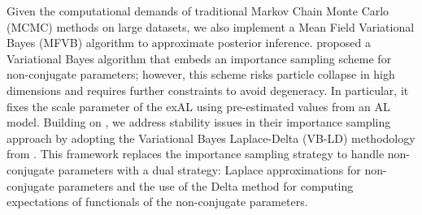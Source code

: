 \documentclass[APA,STIX1COL]{WileyNJD-v2}
\begin{document}
Given the computational demands of traditional Markov Chain Monte Carlo (MCMC) methods on large datasets, we also implement a Mean Field Variational Bayes (MFVB) algorithm to approximate posterior inference.
\citet{barata2021_flex_quantile} proposed a Variational Bayes algorithm that embeds an importance sampling scheme for non-conjugate parameters; however, this scheme risks particle collapse in high dimensions and requires further constraints to avoid degeneracy. In particular, it fixes the scale parameter of the exAL using pre-estimated values from an AL model.
Building on \citet{barata2021_flex_quantile}, we address stability issues in their importance sampling approach by adopting the Variational Bayes Laplace-Delta (VB-LD) methodology from \citet{wang2013nonconjugatevb}. This framework replaces the importance sampling strategy to handle non-conjugate parameters with a dual strategy: Laplace approximations for non-conjugate parameters and the use of the Delta method for computing expectations of functionals of the non-conjugate parameters.
\end{document}
